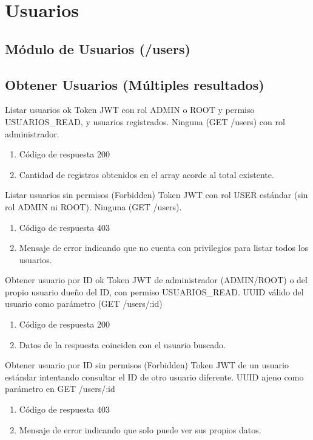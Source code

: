 \section{Usuarios}
\subsection{Módulo de Usuarios (/users)}

\subsection{Obtener Usuarios (Múltiples resultados)}

{Listar usuarios ok}
{Token JWT con rol ADMIN o ROOT y permiso USUARIOS\_READ, y usuarios registrados.}
{Ninguna (GET /users) con rol administrador.}
{\begin{enumerate} [leftmargin=*, nosep]
    \item Código de respuesta 200
    \item Cantidad de registros obtenidos en el array acorde al total existente.
\end{enumerate}}

{Listar usuarios sin permisos (Forbidden)}
{Token JWT con rol USER estándar (sin rol ADMIN ni ROOT).}
{Ninguna (GET /users).}
{\begin{enumerate} [leftmargin=*, nosep]
    \item Código de respuesta 403
    \item Mensaje de error indicando que no cuenta con privilegios para listar todos los usuarios.
\end{enumerate}}

{Obtener usuario por ID ok}
{Token JWT de administrador (ADMIN/ROOT) o del propio usuario dueño del ID, con permiso USUARIOS\_READ.}
{UUID válido del usuario como parámetro (GET /users/:id)}
{\begin{enumerate} [leftmargin=*, nosep]
    \item Código de respuesta 200
    \item Datos de la respuesta coinciden con el usuario buscado.
\end{enumerate}}

{Obtener usuario por ID sin permisos (Forbidden)}
{Token JWT de un usuario estándar intentando consultar el ID de otro usuario diferente.}
{UUID ajeno como parámetro en GET /users/:id}
{\begin{enumerate} [leftmargin=*, nosep]
    \item Código de respuesta 403
    \item Mensaje de error indicando que solo puede ver sus propios datos.
\end{enumerate}}

